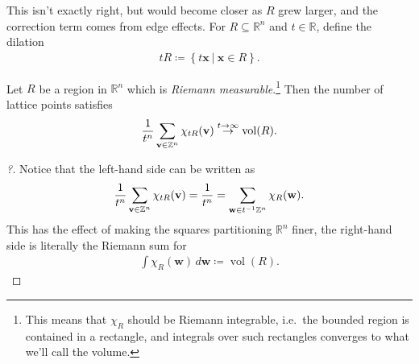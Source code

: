 \begin{remark}
\begin{figure}
{
}
\end{figure}

This isn't exactly right, but would become closer as \(R\) grew larger,
and the correction term comes from edge effects. For
\(R \subseteq {\mathbb{R}}^n\) and \(t\in {\mathbb{R}}\), define the
dilation
\begin{align*}
tR \coloneqq\left\{{ t\mathbf{x} {~\mathrel{\Big|}~}\mathbf{x} \in R }\right\} 
.\end{align*}

\end{remark}

\begin{theorem}[?]

Let \(R\) be a region in \({\mathbb{R}}^n\) which is \emph{Riemann
measurable}.\footnote{This means that \(\chi_R\) should be Riemann
  integrable, i.e.~the bounded region is contained in a rectangle, and
  integrals over such rectangles converges to what we'll call the
  volume.} Then the number of lattice points satisfies
\begin{align*}
{1\over t^n} \sum_{\mathbf{v} \in {\mathbb{Z}}^n} \chi_{tR} (\mathbf{v})
\overset{t\to \infty }\to \operatorname{vol}(R)
.\end{align*}

\end{theorem}

\begin{proof}[?]

Notice that the left-hand side can be written as
\begin{align*}
{1\over t^n} \sum_{\mathbf{v} \in {\mathbb{Z}}^n} \chi_{tR} (\mathbf{v})
=
{1\over t^n} = \sum_{\mathbf{w} \in t^{-1}{\mathbb{Z}}^n} \chi_R(\mathbf{w})
.\end{align*}
This has the effect of making the squares partitioning
\({\mathbb{R}}^n\) finer, the right-hand side is literally the Riemann
sum for
\begin{align*}
\int \chi_R(\mathbf{w}) \,d \mathbf{w} \coloneqq\operatorname{vol}(R)
.\end{align*}

\end{proof}


